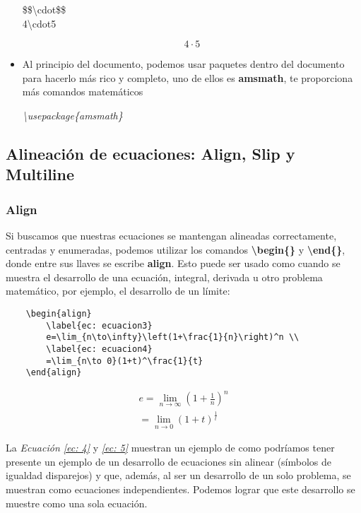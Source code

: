 \begin{itemize}
    \begin{center}
        \$\$\textbackslash{cdot}\$\$\\
        4\textbackslash{cdot}5
    \end{center}
    $$4\cdot5$$
    \item Al principio del documento, podemos usar paquetes dentro del documento para hacerlo más rico y completo, uno de ellos es \textbf{amsmath}, te proporciona más comandos matemáticos\begin{center}\textit{\textbackslash{usepackage\{amsmath\}}}\end{center}
\end{itemize}


\subsection{Alineación de ecuaciones: Align, Slip y Multiline}


\subsubsection{Align}

Si buscamos que nuestras ecuaciones se mantengan alineadas correctamente, centradas y enumeradas, podemos utilizar los comandos \textbf{\textbackslash{begin\{\}}} y \textbf{\textbackslash{end\{\}}}, donde entre sus llaves se escribe \textbf{align}. Esto puede ser usado como cuando se muestra el desarrollo de una ecuación, integral, derivada u otro problema matemático, por ejemplo, el desarrollo de un límite:
\begin{lstlisting}
    \begin{align}
        \label{ec: ecuacion3}
        e=\lim_{n\to\infty}\left(1+\frac{1}{n}\right)^n \\
        \label{ec: ecuacion4}
        =\lim_{n\to 0}(1+t)^\frac{1}{t}
    \end{align}
\end{lstlisting}
\begin{align}
    \label{ec: 4}
    e=\lim_{n\to\infty}\left(1+\frac{1}{n}\right)^n\\
    \label{ec: 5}
    =\lim_{n\to 0}(1+t)^\frac{1}{t}
\end{align}

La \textit{Ecuación \ref{ec: 4}} y \textit{\ref{ec: 5}} muestran un ejemplo de como podríamos tener presente un ejemplo de un desarrollo de ecuaciones sin alinear (símbolos de igualdad disparejos) y que, además, al ser un desarrollo de un solo problema, se muestran como ecuaciones independientes. Podemos lograr que este desarrollo se muestre como una sola ecuación.



